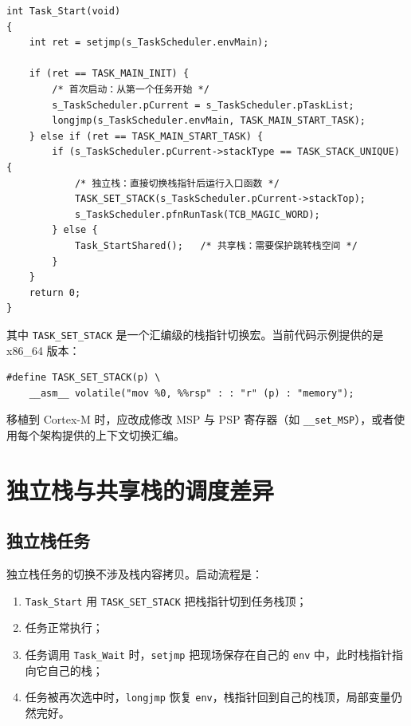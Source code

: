 \begin{lstlisting}[style=c]
int Task_Start(void)
{
    int ret = setjmp(s_TaskScheduler.envMain);

    if (ret == TASK_MAIN_INIT) {
        /* 首次启动：从第一个任务开始 */
        s_TaskScheduler.pCurrent = s_TaskScheduler.pTaskList;
        longjmp(s_TaskScheduler.envMain, TASK_MAIN_START_TASK);
    } else if (ret == TASK_MAIN_START_TASK) {
        if (s_TaskScheduler.pCurrent->stackType == TASK_STACK_UNIQUE) {
            /* 独立栈：直接切换栈指针后运行入口函数 */
            TASK_SET_STACK(s_TaskScheduler.pCurrent->stackTop);
            s_TaskScheduler.pfnRunTask(TCB_MAGIC_WORD);
        } else {
            Task_StartShared();   /* 共享栈：需要保护跳转栈空间 */
        }
    }
    return 0;
}
\end{lstlisting}

其中 \texttt{TASK\_SET\_STACK} 是一个汇编级的栈指针切换宏。当前代码示例提供的是 x86\_64 版本：

\begin{lstlisting}[style=c]
#define TASK_SET_STACK(p) \
    __asm__ volatile("mov %0, %%rsp" : : "r" (p) : "memory");
\end{lstlisting}

移植到 Cortex-M 时，应改成修改 MSP 与 PSP 寄存器（如 \texttt{\_\_set\_MSP}），或者使用每个架构提供的上下文切换汇编。

\section{独立栈与共享栈的调度差异}

\subsection{独立栈任务}

独立栈任务的切换不涉及栈内容拷贝。启动流程是：

\begin{enumerate}
\item \texttt{Task\_Start} 用 \texttt{TASK\_SET\_STACK} 把栈指针切到任务栈顶；
\item 任务正常执行；
\item 任务调用 \texttt{Task\_Wait} 时，\texttt{setjmp} 把现场保存在自己的 \texttt{env} 中，此时栈指针指向它自己的栈；
\item 任务被再次选中时，\texttt{longjmp} 恢复 \texttt{env}，栈指针回到自己的栈顶，局部变量仍然完好。
\end{enumerate}

